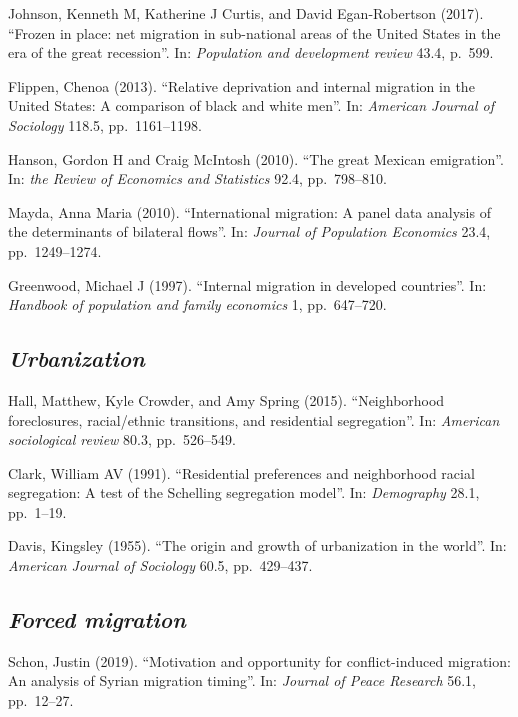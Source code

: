 \documentclass[
  12pt,
]{article}
\begin{document}
Johnson, Kenneth M, Katherine J Curtis, and David Egan-Robertson (2017).
``Frozen in place: net migration in sub-national areas of the United
States in the era of the great recession''. In:
\emph{Population and development review} 43.4, p.~599.

Flippen, Chenoa (2013). ``Relative deprivation and internal migration in
the United States: A comparison of black and white men''. In:
\emph{American Journal of Sociology} 118.5, pp.~1161--1198.

Hanson, Gordon H and Craig McIntosh (2010). ``The great Mexican
emigration''. In: \emph{the Review of Economics and Statistics} 92.4,
pp.~798--810.

Mayda, Anna Maria (2010). ``International migration: A panel data
analysis of the determinants of bilateral flows''. In:
\emph{Journal of Population Economics} 23.4, pp.~1249--1274.

Greenwood, Michael J (1997). ``Internal migration in developed
countries''. In: \emph{Handbook of population and family economics} 1,
pp.~647--720.

\hypertarget{urbanization}{%
\subsection{\texorpdfstring{\emph{Urbanization}}{Urbanization}}\label{urbanization}}

Hall, Matthew, Kyle Crowder, and Amy Spring (2015). ``Neighborhood
foreclosures, racial/ethnic transitions, and residential segregation''.
In: \emph{American sociological review} 80.3, pp.~526--549.

Clark, William AV (1991). ``Residential preferences and neighborhood
racial segregation: A test of the Schelling segregation model''. In:
\emph{Demography} 28.1, pp.~1--19.

Davis, Kingsley (1955). ``The origin and growth of urbanization in the
world''. In: \emph{American Journal of Sociology} 60.5, pp.~429--437.

\hypertarget{forced-migration}{%
\subsection{\texorpdfstring{\emph{Forced
migration}}{Forced migration}}\label{forced-migration}}

Schon, Justin (2019). ``Motivation and opportunity for conflict-induced
migration: An analysis of Syrian migration timing''. In:
\emph{Journal of Peace Research} 56.1, pp.~12--27.
\end{document}
